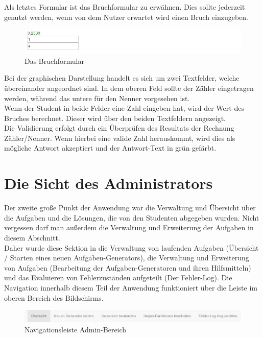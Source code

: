 Als letztes Formular ist das Bruchformular zu erwähnen. Dies sollte jederzeit genutzt werden, wenn von dem Nutzer erwartet wird einen Bruch einzugeben.

\begin{figure}[htp]     %
\centering
\includegraphics[width=1\textwidth]{bilder/FractureForm} 
\caption[Das Bruchformular]{Das Bruchformular}
\end{figure} 

Bei der graphischen Darstellung handelt es sich um zwei Textfelder, welche übereinander angeordnet sind. In dem oberen Feld sollte der Zähler eingetragen werden, während das untere für den Nenner vorgesehen ist. \\
Wenn der Student in beide Felder eine Zahl eingeben hat, wird der Wert des Bruches berechnet. Dieser wird über den beiden Textfeldern angezeigt. \\

Die Validierung erfolgt durch ein Überprüfen des Resultats der Rechnung Zähler/Nenner. Wenn hierbei eine valide Zahl herauskommt, wird dies als mögliche Antwort akzeptiert und der Antwort-Text in grün gefärbt.


\section{Die Sicht des Administrators}

Der zweite große Punkt der Anwendung war die Verwaltung und Übersicht über die Aufgaben und die Lösungen, die von den Studenten abgegeben wurden. Nicht vergessen darf man außerdem die Verwaltung und Erweiterung der Aufgaben in diesem Abschnitt. \\

Daher wurde diese Sektion in die Verwaltung von laufenden Aufgaben (Übersicht / Starten eines neuen Aufgaben-Generators), die Verwaltung und Erweiterung von Aufgaben (Bearbeitung der Aufgaben-Generatoren und ihren Hilfsmitteln) und das Evaluieren von Fehlerzuständen aufgeteilt (Der Fehler-Log). Die Navigation innerhalb diesem Teil der Anwendung funktioniert über die Leiste im oberen Bereich des Bildschirms. \\
\begin{figure}[htp]     %
\centering
\includegraphics[width=1\textwidth]{bilder/NavBar} 
\caption[Navigationsleiste Admin-Bereich]{Navigationsleiste Admin-Bereich}
\end{figure} 

